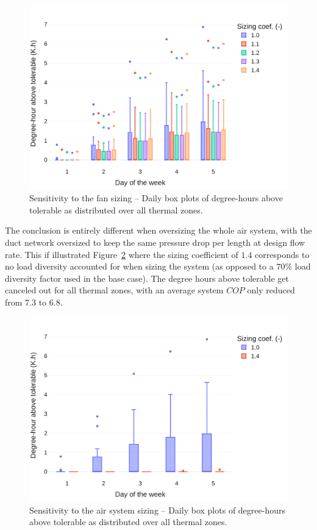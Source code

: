 \begin{figure}[!htbp]
    \centering
    \includegraphics[width=.7\linewidth]{../python_scripts/figures/FanSizing.pdf}
    \caption{Sensitivity to the fan sizing -- Daily box plots of degree-hours above tolerable as distributed over all thermal zones.}
    \label{fig:fan}
\end{figure}

The conclusion is entirely different when oversizing the whole air system, with the duct network oversized to keep the same pressure drop per length at design flow rate. This if illustrated Figure~\ref{fig:system} where the sizing coefficient of $1.4$ corresponds to no load diversity accounted for when sizing the system (as opposed to a $70\%$ load diversity factor used in the base case). The degree hours above tolerable get canceled out for all thermal zones, with an average system $COP$ only reduced from $7.3$ to $6.8$.

\begin{figure}[!htbp]
    \centering
    \includegraphics[width=.7\linewidth]{../python_scripts/figures/SystemSizing.pdf}
    \caption{Sensitivity to the air system sizing -- Daily box plots of degree-hours above tolerable as distributed over all thermal zones.}
    \label{fig:system}
\end{figure}


